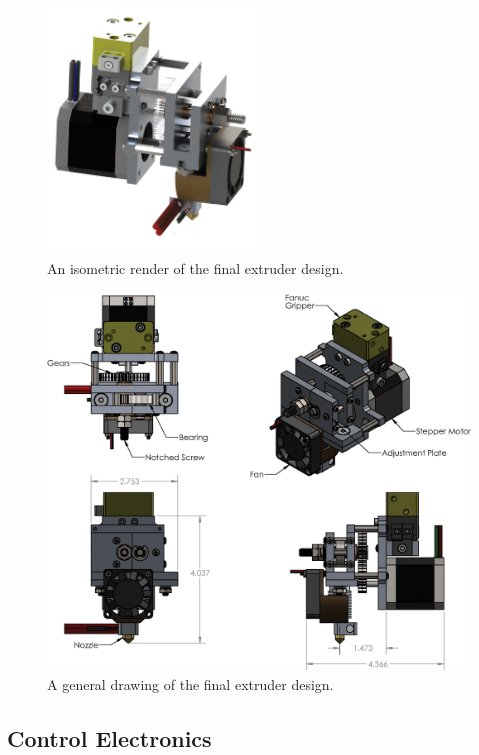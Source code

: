 \begin{figure}[h!]
\centering
\includegraphics[width=0.5\textwidth]{./figures/extruder-iso}
\caption{An isometric render of the final extruder design.}
\label{fig:extruder iso}
\end{figure}

\begin{figure}[h!]
\centering
\includegraphics[width=1\textwidth]{./figures/extruder-drawing}
\caption{A general drawing of the final extruder design.}
\label{fig:extruder drawing}
\end{figure}

\clearpage




\subsection{Control Electronics}

